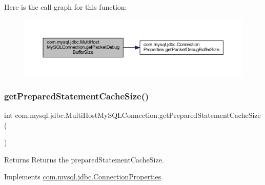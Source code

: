 Here is the call graph for this function\+:
\nopagebreak
\begin{figure}[H]
\begin{center}
\leavevmode
\includegraphics[width=350pt]{classcom_1_1mysql_1_1jdbc_1_1_multi_host_my_s_q_l_connection_a7201e5e89691f622bba29279e5e49ffb_cgraph}
\end{center}
\end{figure}
\mbox{\label{classcom_1_1mysql_1_1jdbc_1_1_multi_host_my_s_q_l_connection_a6308b3767baa0f4cbf8eecdd7991533d}} 
\subsubsection{\texorpdfstring{get\+Prepared\+Statement\+Cache\+Size()}{getPreparedStatementCacheSize()}}
{\footnotesize\ttfamily int com.\+mysql.\+jdbc.\+Multi\+Host\+My\+S\+Q\+L\+Connection.\+get\+Prepared\+Statement\+Cache\+Size (\begin{DoxyParamCaption}{ }\end{DoxyParamCaption})}

\begin{DoxyReturn}{Returns}
Returns the prepared\+Statement\+Cache\+Size. 
\end{DoxyReturn}


Implements \mbox{\hyperlink{interfacecom_1_1mysql_1_1jdbc_1_1_connection_properties_ad0bf062f59dcc82790e2d539c3a79924}{com.\+mysql.\+jdbc.\+Connection\+Properties}}.

